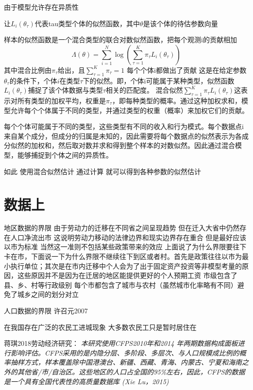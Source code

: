 \documentclass[a4paper,12pt,oneside]{book} %
\begin{document}
由于模型允许存在异质性

让$L_{i}(\theta_{\tau})$代表tau类型个体的似然函数，其中$\theta$是该个体的待估参数向量

样本的似然函数是一个混合类型的联合对数似然函数，把每个观测i的贡献相加
\begin{equation}
\Lambda(\theta)=\sum\limits_{i=1}^{N}\log(\sum\limits_{\tau=1}^{K}\pi_{\tau}L_{i}(\theta_{\tau})) 
\end{equation}
其中混合比例由$\pi_{\tau}$给出，且$\sum\limits_{\tau=1}^{K}\pi_{\tau}=1$
每个个体i都做出了贡献
这是在给定参数$\theta_{\tau}$的条件下，个体$i$在类型$\tau$下的似然。即，个体i可能属于某种类型，似然函数
$L_i(\theta_{\tau})$捕捉了该个体数据与类型$\tau$相关的匹配度。
混合似然$\sum_{\tau=1}^{K} \pi_{\tau} L_i(\theta_{\tau})$这表示对所有类型的加权平均，权重是$\pi_{\tau}$，即每种类型的概率。通过这种加权求和，模型允许每个个体属于不同的类型，并通过类型的权重（概率）来加权它们的贡献。

每个个体可能属于不同的类型，这些类型有不同的收入和行为模式。每个数据点i来自某个成分，但成分的归属是未知的，因此需要将每个数据点的似然表示为各成分似然的加权和，然后取对数并求和得到整个样本的对数似然。因此通过混合模型，能够捕捉到个体之间的异质性。


如此
使用混合似然估计
通过计算
就可以得到各种参数的似然估计




\section{数据上}

地区数据的界限
由于劳动力的迁移在不同省之间呈现趋势 但在迁入大省中仍然存在人口净流出市 这说明劳动力移动的法律边界和现实边界存在重合 但是最好应该以市为标准 当然这一准则不包括某些政策带来的效应
上面说了为什么界限要往下卡在市，下面说一下为什么界限不继续往下到区或者村。首先是政策往往以市为最小执行单位；其次是在市内迁移中个人会为了出于固定资产投资等非模型考量的原因，这些原因并不是因为在迁居的地区能提供更好的个人预期工资
市级包含了县、乡、村等行政级别 每个市都包含了城市与农村（虽然城市化率略有不同）避免了城乡之间的划分对立


人口数据的界限
许召元2007

在我国存在广泛的农民工进城现象 大多数农民工只是暂时居住在


蒋琪2018劳动经济研究：
\textit{本研究使用CFPS2010年和2014 年两期数据构成面板进行影响评估。CFPS采用的是内隐分层、多阶段、多层次、与人口规模成比例的概率抽样方式，样本覆盖除中国港澳台、新疆、西藏、青海、内蒙古、宁夏和海南之外的其他省/市/自治区。这些地区的人口占全国的95\%左右，因此，CFPS的数据是一个具有全国代表性的高质量数据库 (Xie \＆ Lu，2015)}
\end{document}
